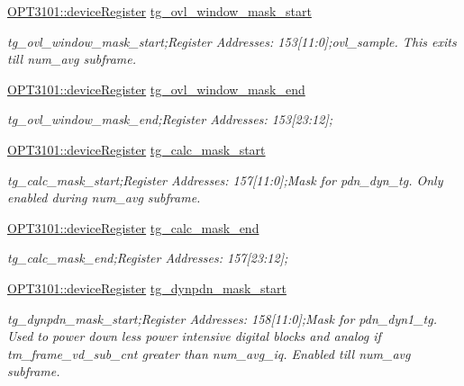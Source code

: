 \begin{DoxyCompactItemize}
\mbox{\hyperlink{class_o_p_t3101_1_1device_register}{O\+P\+T3101\+::device\+Register}} \mbox{\hyperlink{class_o_p_t3101_1_1registers_a990dca0856bffa9f6b8050a0630583bc}{tg\+\_\+ovl\+\_\+window\+\_\+mask\+\_\+start}}
\begin{DoxyCompactList}\small\item\em tg\+\_\+ovl\+\_\+window\+\_\+mask\+\_\+start;Register Addresses\+: 153\mbox{[}11\+:0\mbox{]};ovl\+\_\+sample. This exits till num\+\_\+avg subframe. \end{DoxyCompactList}\item 
\mbox{\hyperlink{class_o_p_t3101_1_1device_register}{O\+P\+T3101\+::device\+Register}} \mbox{\hyperlink{class_o_p_t3101_1_1registers_aec4f1ad9cea554d2ab16e0808ac25b49}{tg\+\_\+ovl\+\_\+window\+\_\+mask\+\_\+end}}
\begin{DoxyCompactList}\small\item\em tg\+\_\+ovl\+\_\+window\+\_\+mask\+\_\+end;Register Addresses\+: 153\mbox{[}23\+:12\mbox{]}; \end{DoxyCompactList}\item 
\mbox{\hyperlink{class_o_p_t3101_1_1device_register}{O\+P\+T3101\+::device\+Register}} \mbox{\hyperlink{class_o_p_t3101_1_1registers_afff23a0f85b17bf4808705d0231a719f}{tg\+\_\+calc\+\_\+mask\+\_\+start}}
\begin{DoxyCompactList}\small\item\em tg\+\_\+calc\+\_\+mask\+\_\+start;Register Addresses\+: 157\mbox{[}11\+:0\mbox{]};Mask for pdn\+\_\+dyn\+\_\+tg. Only enabled during num\+\_\+avg subframe. \end{DoxyCompactList}\item 
\mbox{\hyperlink{class_o_p_t3101_1_1device_register}{O\+P\+T3101\+::device\+Register}} \mbox{\hyperlink{class_o_p_t3101_1_1registers_ac2457d824429320efe1f38d56ba0a17e}{tg\+\_\+calc\+\_\+mask\+\_\+end}}
\begin{DoxyCompactList}\small\item\em tg\+\_\+calc\+\_\+mask\+\_\+end;Register Addresses\+: 157\mbox{[}23\+:12\mbox{]}; \end{DoxyCompactList}\item 
\mbox{\hyperlink{class_o_p_t3101_1_1device_register}{O\+P\+T3101\+::device\+Register}} \mbox{\hyperlink{class_o_p_t3101_1_1registers_a56cd0f8b97af20f554e11b34982aba81}{tg\+\_\+dynpdn\+\_\+mask\+\_\+start}}
\begin{DoxyCompactList}\small\item\em tg\+\_\+dynpdn\+\_\+mask\+\_\+start;Register Addresses\+: 158\mbox{[}11\+:0\mbox{]};Mask for pdn\+\_\+dyn1\+\_\+tg. Used to power down less power intensive digital blocks and analog if tm\+\_\+frame\+\_\+vd\+\_\+sub\+\_\+cnt greater than num\+\_\+avg\+\_\+iq. Enabled till num\+\_\+avg subframe. \end{DoxyCompactList}\item 

\end{DoxyCompactItemize}
